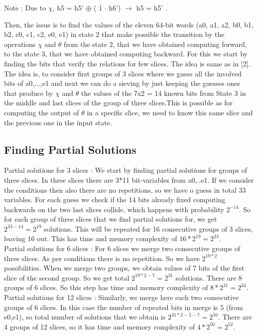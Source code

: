 \documentclass{article}
\begin{document}
Note : Due to $\chi$, h5 = h5' $\oplus$ ( $\bar 1$ $\cdot$ h6') $\to$ h5 = h5' .

\newpar
Then, the issue is to find the values of the eleven 64-bit words (a0, a1, a2, b0, b1, b2, c0, c1, c2, e0, e1) in state 2 that make possible the transition by the operations $\chi$ and $\theta$ from the state 2, that we have obtained computing forward, to the state 3, that we have obtained computing backward. For this we start by finding the bits that verify the relations for few slices.  The idea is same as in [2]. The idea is, to consider first groups of 3 slices where we guess all the involved bits of a0,...,e1 and next we can do a sieving by just keeping the guesses ones that produce by $\chi$ and $\theta$ the values of the 7x2 = 14 known bits from State 3 in the middle and last slices of the group of three slices.This is possible as for computing the output of $\theta$ in a specific slice, we need to know this same slice and the previous one in the input state.

\subsection{Finding Partial Solutions}

\newpar
Partial solutions for 3 slices : We start by finding partial solutions for groups of three slices. In three slices there are 3*11 bit-variables from a0,..e1. If we consider the conditions then also there are no repetitions, so we have o guess in total 33 variables. For each guess we check if the 14 bits already fixed computing backwards on the two last slices collide, which happens with probability $2^{-14}$. So for each group of three slices that we find partial solutions for, we get $2^{33 - 14} = 2^{19}$ solutions. This will be repeated for 16 consecutive groups of 3 slices, leaving 16 out. This has time and memory complexity of $16 * 2^{19} = 2^{23}$.\\

\newpar
Partial solutions for 6 slices : For 6 slices we merge two consecutive groups of three slices. As per conditions there is no repetition. So we have $2^{19*2}$ possibilities. When we merge two groups, we obtain values of 7 bits of the first slice of the second group. So we get total $2^{19*2 - 7 } = 2^{31}$ solutions. There are 8 groups of 6 slices. So this step has time and memory complexity of $8*2^{31} = 2^{34}$.\\

\newpar
Partial solutions for 12 slices : Similarly, we merge here each two consecutive groups of 6 slices. In this case the number of repeated bits in merge is 5 (from e0,e1), so total number of solutions that we obtain is $2^{31*2 - 5 - 7 } = 2^{50}$. There are 4 groups of 12 slices, so it has time and memory complexity of $4*2^{50} = 2^{52}$.\\
\end{document}

